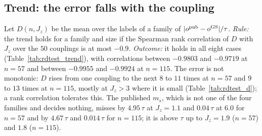 \documentclass[aps,prx,onecolumn,10pt,nofootinbib,longbibliography,floatfix]{revtex4-2}
\theoremstyle{remark}
\newcommand{\Jz}{J_z}
\newcommand{\ms}{m_s}
\newcommand{\GS}{\mathrm{GS}}
\begin{document}
\def\SMcap{Sign of the error of the public labels (three of the five declared tests; one decision per family and size). Labels: number of labels in
the family; pairs: labels times the $50$ couplings; not over-ordered: pairs with $t\le0$; $F$: fraction of pairs with %
$t>0$; last two columns: range of $t$ over the pairs. Second neighbours: the second-neighbour correlations of the
public record.}\def\SMlab{tab:rdtest_sign}


\subsection{Trend: the error falls with the coupling}
Let $D(n,\Jz)$ be the mean over the labels of a family of $|o^{\rm pub}-o^{\GS}|/\tau$. \emph{Rule:} the trend holds
for a family and size if the Spearman rank correlation of $D$ with $\Jz$ over the $50$ couplings is at most $-0.9$. %
\emph{Outcome:} it holds in all eight cases (Table~\ref{tab:rdtest_trend}), with correlations between $-0.9803$ and %
$-0.9719$ at $n=57$ and between $-0.9955$ and $-0.9924$ at $n=115$. The error is not monotonic: $D$ rises from one %
coupling to the next $8$ to $11$ times at $n=57$ and $9$ to $13$ times at $n=115$, mostly at $\Jz>3$ where it is %
small (Table~\ref{tab:rdtest_d}); a rank correlation tolerates this. The published $\ms$, which is not one of the
four families and decides nothing, misses by $4.95\,\tau$ at $\Jz=1.1$ and $0.04\,\tau$ at $6.0$ for $n=57$ and by %
$4.67\,\tau$ and $0.014\,\tau$ for $n=115$; it is above $\tau$ up to $\Jz=1.9$ ($n=57$) and $1.8$ ($n=115$). %

\def\SMcap{Trend of the error of the public labels with the coupling (declared test; one decision per family and
size). $D$: mean error of the family in units of each label's $\tau$.}\def\SMlab{tab:rdtest_trend}

\end{document}
